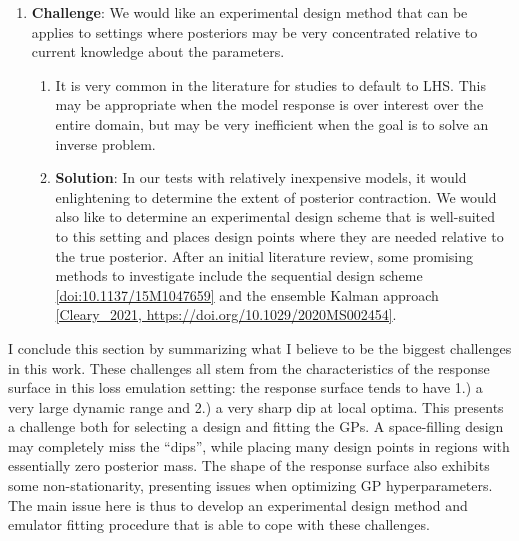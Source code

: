 \documentclass[12pt]{article}
\begin{document}
\begin{enumerate}
\item \textbf{Challenge}: We would like an experimental design method that can be applies to settings where posteriors may be very concentrated relative to current knowledge about the parameters. 
	\begin{enumerate}
	\item It is very common in the literature for studies to default to LHS. This may be appropriate when the model response is over interest over the entire domain, but may be very inefficient 
	when the goal is to solve an inverse problem. 
	\item \textbf{Solution}: In our tests with relatively inexpensive models, it would enlightening to determine the extent of posterior contraction. We would also like to determine an experimental 
	design scheme that is well-suited to this setting and places design points where they are needed relative to the true posterior. After an initial literature review, some promising methods to 
	investigate include the sequential design scheme \ref{doi:10.1137/15M1047659} and the ensemble Kalman approach \ref{Cleary_2021, https://doi.org/10.1029/2020MS002454}. 
	\end{enumerate}
\end{enumerate}

I conclude this section by summarizing what I believe to be the biggest challenges in this work. These challenges all stem from the characteristics of the response surface in this loss emulation setting: 
the response surface tends to have 1.) a very large dynamic range and 2.) a very sharp dip at local optima. This presents a challenge both for selecting a design and fitting the GPs. A space-filling design 
may completely miss the ``dips'', while placing many design points in regions with essentially zero posterior mass. The shape of the response surface also exhibits some non-stationarity, presenting issues 
when optimizing GP hyperparameters. The main issue here is thus to develop an experimental design method and emulator fitting procedure that is able to cope with these challenges.


\end{document}
